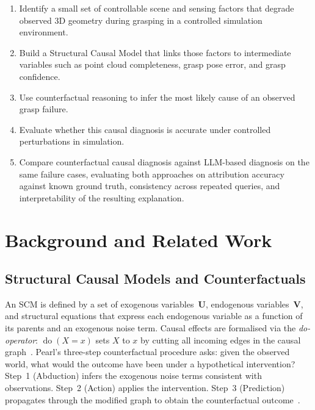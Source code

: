 \documentclass[journal]{IEEEtran}
\newcommand{\doop}{\operatorname{do}}
\begin{document}
\begin{enumerate}
  \item Identify a small set of controllable scene and sensing
        factors that degrade observed 3D geometry during grasping
        in a controlled simulation environment.
  \item Build a Structural Causal Model that links those factors to
        intermediate variables such as point cloud completeness,
        grasp pose error, and grasp confidence.
  \item Use counterfactual reasoning to infer the most likely cause
        of an observed grasp failure.
  \item Evaluate whether this causal diagnosis is accurate under
        controlled perturbations in simulation.
  \item Compare counterfactual causal diagnosis against LLM-based
        diagnosis on the same failure cases, evaluating both
        approaches on attribution accuracy against known ground
        truth, consistency across repeated queries, and
        interpretability of the resulting explanation.
\end{enumerate}

\section{Background and Related Work}
\label{sec:background}

\subsection{Structural Causal Models and Counterfactuals}

An SCM is defined by a set of exogenous variables~$\mathbf{U}$,
endogenous variables~$\mathbf{V}$, and structural equations that
express each endogenous variable as a function of its parents and
an exogenous noise term.  Causal effects are formalised via the
\emph{do-operator}: $\doop(X{=}x)$ sets $X$ to $x$ by cutting all
incoming edges in the causal graph~\cite{pearl2009causality}.
Pearl's three-step counterfactual procedure asks: given the
observed world, what would the outcome have been under a hypothetical
intervention?  Step~1 (Abduction) infers the exogenous noise terms
consistent with observations.  Step~2 (Action) applies the
intervention.  Step~3 (Prediction) propagates through the modified
graph to obtain the counterfactual outcome~\cite{pearl2018book}.
\end{document}
